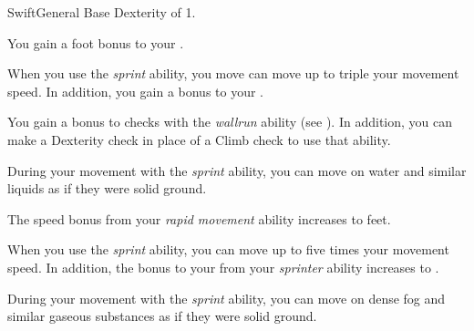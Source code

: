     \begin{feat}{Swift}{General}
        \featpre Base Dexterity of 1.

         You gain a  foot bonus to your .

         When you use the \textit{sprint} ability, you move can move up to triple your movement speed.
        In addition, you gain a  bonus to your .

         You gain a  bonus to checks with the \textit{wallrun} ability (see ).
        In addition, you can make a Dexterity check in place of a Climb check to use that ability.

         During your movement with the \textit{sprint} ability, you can move on water and similar liquids as if they were solid ground.

         The speed bonus from your \textit{rapid movement} ability increases to  feet.

         When you use the \textit{sprint} ability, you can move up to five times your movement speed.
        In addition, the bonus to your  from your \textit{sprinter} ability increases to .

         During your movement with the \textit{sprint} ability, you can move on dense fog and similar gaseous substances as if they were solid ground.
    \end{feat}

